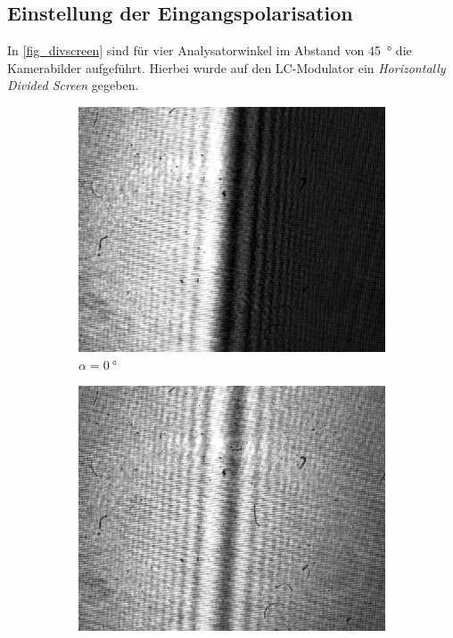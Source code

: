 \documentclass[
	a4paper,
	12pt,
	pagesize,
	ngerman
]{scrartcl}
\begin{document}
		\subsection{Einstellung der Eingangspolarisation}
		In \cref{fig_divscreen} sind für vier Analysatorwinkel im Abstand von \SI{45}{\degree} die Kamerabilder aufgeführt.
		Hierbei wurde auf den LC-Modulator ein \textit{Horizontally Divided Screen} gegeben.
		\begin{figure}[H]
        \centering
        \begin{subfigure}[b]{0.475\textwidth}
            \centering
            \includegraphics[width=\textwidth]{raw/dividedscreen_0_deg}
            \caption%
            {$\alpha=\SI{0}{\degree}$}
            \label{fig_divscreen_0}
        \end{subfigure}
        \hfill
        \begin{subfigure}[b]{0.475\textwidth}
            \centering
            \includegraphics[width=\textwidth]{raw/dividedscreen_45_deg}

\end{subfigure}
\end{figure}
\end{document}
